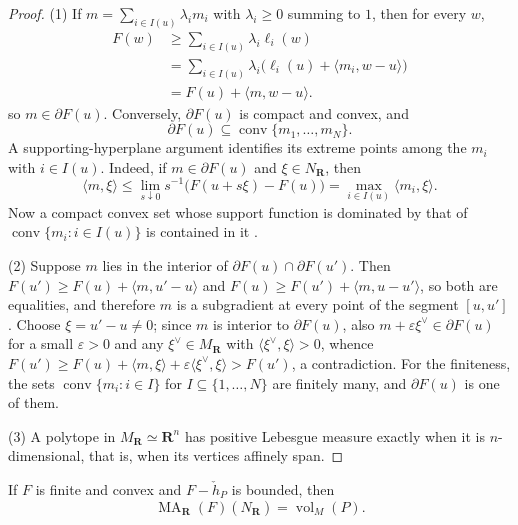 \begin{proof}
(1)  If $m=\sum_{i\in I(u)}\lambda_im_i$ with $\lambda_i\geq0$ summing to
$1$, then for every $w$,
\[
 \begin{aligned}
  F(w)&\geq\sum_{i\in I(u)}\lambda_i\ell_i(w)\\
      &=\sum_{i\in I(u)}\lambda_i
        \bigl(\ell_i(u)+\langle m_i,w-u\rangle\bigr)\\
      &=F(u)+\langle m,w-u\rangle .
 \end{aligned}
\]
so $m\in\partial F(u)$.  Conversely, $\partial F(u)$ is compact and convex,
and
\[
 \partial F(u)\subseteq\operatorname{conv}\{m_1,\ldots,m_N\}.
\]
A supporting-hyperplane argument identifies its extreme points among the
$m_i$ with $i\in I(u)$.  Indeed, if $m\in\partial F(u)$ and
$\xi\in N_{\mathbf R}$, then
\[
 \langle m,\xi\rangle
 \leq\lim_{s\downarrow0}s^{-1}\bigl(F(u+s\xi)-F(u)\bigr)
 =\max_{i\in I(u)}\langle m_i,\xi\rangle.
\]
Now a compact convex set whose
support function is dominated by that of
$\operatorname{conv}\{m_i:i\in I(u)\}$ is contained in it
\cite[Section~1.7]{Sch14}.

(2)  Suppose $m$ lies in the interior of $\partial F(u)\cap\partial F(u')$.
Then $F(u')\geq F(u)+\langle m,u'-u\rangle$ and
$F(u)\geq F(u')+\langle m,u-u'\rangle$, so both are equalities, and
therefore $m$ is a subgradient at every point of the segment $[u,u']$.
Choose $\xi=u'-u\neq0$; since $m$ is interior to $\partial F(u)$, also
$m+\varepsilon\xi^\vee\in\partial F(u)$ for a small $\varepsilon>0$ and any
$\xi^\vee\in M_{\mathbf R}$ with $\langle\xi^\vee,\xi\rangle>0$, whence
$F(u')\geq F(u)+\langle m,\xi\rangle+\varepsilon\langle\xi^\vee,\xi\rangle
>F(u')$, a contradiction.  For the finiteness, the sets
$\operatorname{conv}\{m_i:i\in I\}$ for $I\subseteq\{1,\ldots,N\}$ are
finitely many, and $\partial F(u)$ is one of them.

(3)  A polytope in $M_{\mathbf R}\simeq\mathbf R^n$ has positive Lebesgue
measure exactly when it is $n$-dimensional, that is, when its vertices
affinely span.
\end{proof}

\begin{lemma}\label{lem:toric-real-total-mass}
If $F$ is finite and convex and $F-\check h_P$ is bounded, then
\[
                 \operatorname{MA}_{\mathbf R}(F)(N_{\mathbf R})
                 =\operatorname{vol}_M(P).
\]
\end{lemma}

